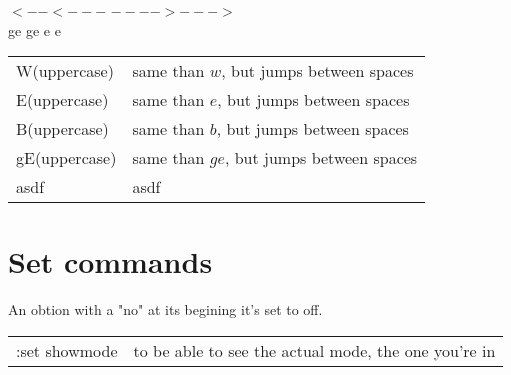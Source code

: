 \documentclass[11p]{book}
\begin{document}
\hspace*{4.2cm}$<--<---$ \hspace*{1cm } $---->--->$ \\
\hspace*{5.2cm} ge \hspace*{0.6cm} ge  \hspace*{2cm} e \hspace*{1cm} e\\


\begin{tabular}{p{2cm} p{13cm}}
W(uppercase) & same than $w$, but jumps between spaces \\
E(uppercase) & same than $e$, but jumps between spaces \\
B(uppercase) & same than $b$, but jumps between spaces \\
gE(uppercase) & same than $ge$, but jumps between spaces \\
\hline
asdf & asdf \\

\end{tabular}

\newpage
\section*{Set commands}
An obtion with a "no" at its begining it's set to off. \\

\begin{tabular}{p{4cm} l}
:set showmode & to be able to see the actual mode, the one you're in \\

\end{tabular}
\end{document}
